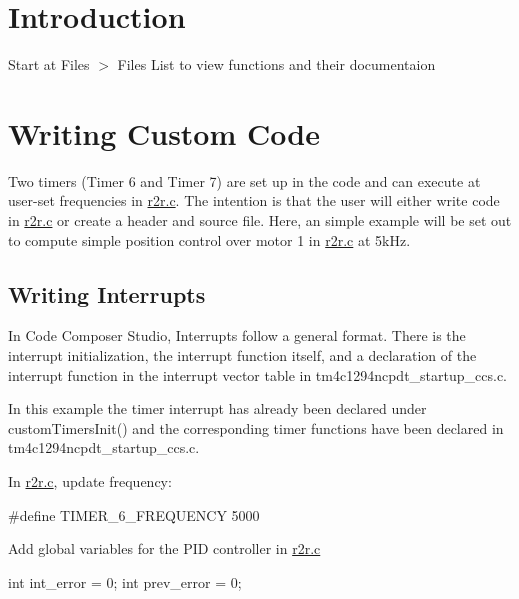 \hypertarget{index_intro_sec}{}\section{Introduction}\label{index_intro_sec}
Start at {\ttfamily Files $>$ Files List} to view functions and their documentaion\hypertarget{index_writingcustomcode}{}\section{Writing Custom Code}\label{index_writingcustomcode}
Two timers (Timer 6 and Timer 7) are set up in the code and can execute at user-\/set frequencies in {\ttfamily \mbox{\hyperlink{r2r_8c}{r2r.\+c}}}. The intention is that the user will either write code in \mbox{\hyperlink{r2r_8c}{r2r.\+c}} or create a header and source file. Here, an simple example will be set out to compute simple position control over motor 1 in \mbox{\hyperlink{r2r_8c}{r2r.\+c}} at 5k\+Hz.\hypertarget{index_writinginterrupts}{}\subsection{Writing Interrupts}\label{index_writinginterrupts}
In Code Composer Studio, Interrupts follow a general format. There is the interrupt initialization, the interrupt function itself, and a declaration of the interrupt function in the interrupt vector table in {\ttfamily tm4c1294ncpdt\+\_\+startup\+\_\+ccs.\+c}.

In this example the timer interrupt has already been declared under {\ttfamily custom\+Timers\+Init()} and the corresponding timer functions have been declared in {\ttfamily tm4c1294ncpdt\+\_\+startup\+\_\+ccs.\+c}.

In {\ttfamily \mbox{\hyperlink{r2r_8c}{r2r.\+c}}}, update frequency\+: \begin{DoxyVerb}    #define TIMER_6_FREQUENCY 5000
\end{DoxyVerb}


Add global variables for the P\+ID controller in {\ttfamily \mbox{\hyperlink{r2r_8c}{r2r.\+c}}} \begin{DoxyVerb}int int_error = 0;
int prev_error = 0;
\end{DoxyVerb}


